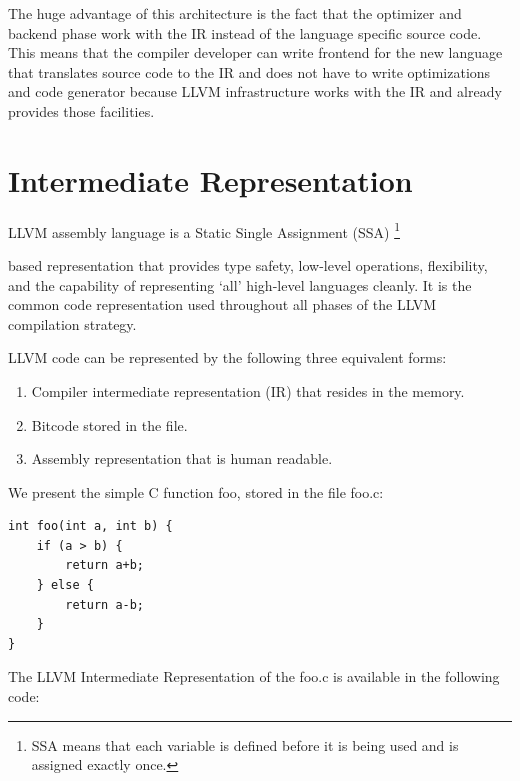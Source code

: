 \documentclass[12pt, twoside]{fithesis2}
\renewcommand{\_}{\leavevmode \kern0.07em\vbox{\hrule width0.4em}}
\newenvironment{myEnumerate}{
  \begin{enumerate}[
    leftmargin=2em,
    rightmargin=1em,
    itemsep=\parskip,
    parsep=0em,
    topsep=0em,
    partopsep=0em
]
}{
  \end{enumerate}
}
\begin{document}
The huge advantage of this architecture is the fact that the optimizer and
backend phase work with the IR instead of the language specific source code.
This means that the compiler developer can write frontend for the new language
that translates source code to the IR and does not have to write optimizations
and code generator because LLVM infrastructure works with the IR and already
provides those facilities.

\section{Intermediate Representation}
\label{sec:llvm-ir}

LLVM assembly language is a Static Single Assignment (SSA)
\footnote{
SSA means that each variable is defined before it is being used and is assigned
exactly once.
}

based
representation that provides type safety, low-level operations, flexibility,
and the capability of representing ‘all’ high-level languages cleanly. It is
the common code representation used throughout all phases of the LLVM
compilation strategy.
\cite{llvm-ir}

LLVM code can be represented by the following three equivalent forms:
\begin{myEnumerate}
\item Compiler intermediate representation (IR) that resides in the memory.
\item Bitcode stored in the file.
\item Assembly representation that is human readable.
\end{myEnumerate}

\bigskip
\noindent
We present the simple C function foo, stored in the file foo.c:

\begin{verbatim}
int foo(int a, int b) {
    if (a > b) {
        return a+b;
    } else {
        return a-b;
    }
}
\end{verbatim}

The LLVM Intermediate Representation of the foo.c is available in the following
code:
\end{document}
